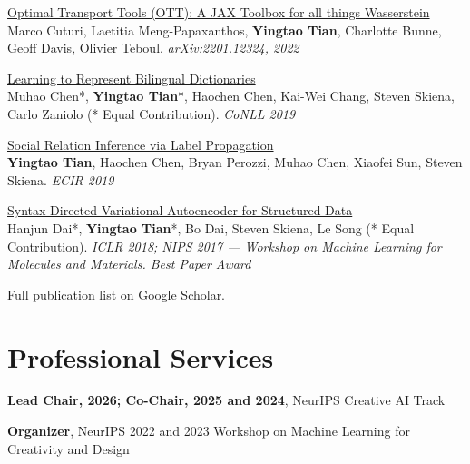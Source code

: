 \documentclass[line,margin]{cv}
\newcommand{\myemph}{\textbf}
\begin{document}
\begin{resume}
{  \begin{samepage}
  \href{https://arxiv.org/abs/2201.12324}{Optimal Transport Tools (OTT): A JAX Toolbox for all things Wasserstein}\\
  Marco Cuturi, Laetitia Meng-Papaxanthos, \textbf{Yingtao Tian}, Charlotte Bunne, Geoff Davis, Olivier Teboul. \emph{arXiv:2201.12324, 2022}
  \par\end{samepage}

  \begin{samepage}
  \href{https://arxiv.org/abs/1808.03726}{Learning to Represent Bilingual Dictionaries}\\
  Muhao Chen*, \textbf{Yingtao Tian}*, Haochen Chen, Kai-Wei Chang, Steven Skiena, Carlo Zaniolo (* Equal Contribution). \emph{CoNLL 2019}
  \par\end{samepage}

  \begin{samepage}
  \href{http://www.mlgworkshop.org/2018/papers/MLG2018\_paper\_58.pdf}{Social Relation Inference via Label Propagation}\\
  \textbf{Yingtao Tian}, Haochen Chen, Bryan Perozzi, Muhao Chen, Xiaofei Sun, Steven Skiena. \emph{ECIR 2019}
  \par\end{samepage}

  \begin{samepage}
  \href{https://openreview.net/forum?id=SyqShMZRb}{Syntax-Directed Variational Autoencoder for Structured Data}\\
  Hanjun Dai*, \textbf{Yingtao Tian}*, Bo Dai, Steven Skiena, Le Song (* Equal Contribution). \emph{ICLR 2018; NIPS 2017 --- Workshop on Machine Learning for Molecules and Materials. Best Paper Award}
  \par\end{samepage}

}

\href{https://scholar.google.com/citations?user=17Fe5K0AAAAJ}{Full publication list on Google Scholar.}

\section{Professional Services}
  \myemph{Lead Chair, 2026; Co-Chair, 2025 and 2024}, NeurIPS Creative AI Track

  \myemph{Organizer}, NeurIPS 2022 and 2023 Workshop on Machine Learning for Creativity and Design


\end{resume}
\end{document}

